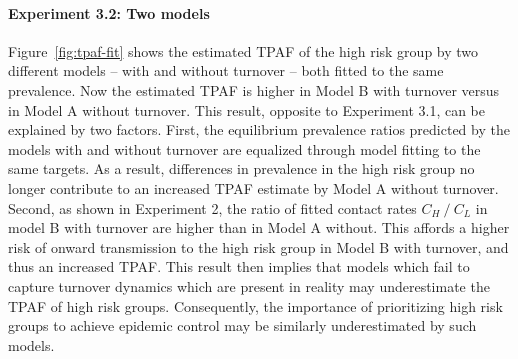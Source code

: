\paragraph{Experiment 3.2: Two models}
\label{p:res-tpaf-fit}
Figure~\ref{fig:tpaf-fit} shows the estimated TPAF of the high risk group
by two different models -- with and without turnover --
both fitted to the same prevalence.
Now the estimated TPAF is higher
in Model B with turnover versus
in Model A without turnover.
This result, opposite to Experiment 3.1, can be explained by two factors.
First, the equilibrium prevalence ratios predicted by the models with and without turnover
are equalized through model fitting to the same targets.
As a result, differences in prevalence in the high risk group
no longer contribute to an increased TPAF estimate by Model A without turnover.
Second, as shown in Experiment 2, 
the ratio of fitted contact rates $C_H~/~C_L$ in model B with turnover
are higher than in Model A without.
This affords a higher risk of onward transmission to the high risk group
in Model B with turnover, and thus an increased TPAF.
This result then implies that
models which fail to capture turnover dynamics which are present in reality
may underestimate the TPAF of high risk groups.
Consequently, the importance of prioritizing high risk groups
to achieve epidemic control may be similarly underestimated by such models.
